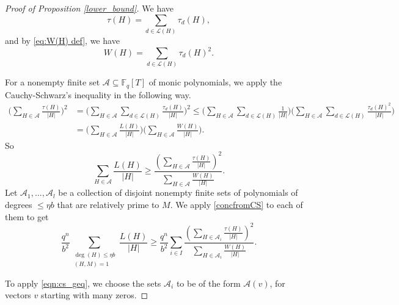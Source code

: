 \documentclass[12pt]{amsart}
\numberwithin{equation}{section}
\theoremstyle{definition}
\theoremstyle{remark}
\newcommand{\FF}{\mathbb{F}}
\begin{document}
\begin{proof}[Proof of Proposition \ref{lower_bound}]
    We have
    \[
        \tau (H) = \sum_{d \in \mathcal{L}(H)} \tau_d(H),
    \]
    and by 
    \eqref{eq:W(H) def}, we have
    \[
        W(H) = \sum_{d \in \mathcal{L}(H)} \tau_d(H)^2.
    \]
    
    For a nonempty finite set $\mathcal{A}\subseteq \FF_q[T]$ of monic polynomials, we apply the Cauchy-Schwarz's inequality in the following way.
    \begin{align*}
        \Big( \sum_{H \in \mathcal{A}} \frac{\tau(H)}{|H|} \Big) ^2 &= 
        \Big( \sum_{H \in \mathcal{A}} \sum_{d \in \mathcal{L}(H)} \frac{\tau_d(H)}{|H|} \Big) ^2  
        \leq
        \Big( \sum_{H \in \mathcal{A}} \sum_{d \in \mathcal{L}(H)} \frac{1}{|H|} \Big) \Big( \sum_{H \in \mathcal{A}} \sum_{d \in \mathcal{L}(H)} \frac{\tau_d(H)^2}{|H|} \Big) \\
        &= \Big( \sum_{H \in \mathcal{A}} \frac{L(H)}{|H|} \Big) 
        \Big( \sum_{H \in \mathcal{A}} \frac{W(H)}{|H|} \Big).
    \end{align*}
    So 
    \begin{equation}\label{concfromCS}
         \sum_{H \in \mathcal{A}} \frac{L(H)}{|H|}  \geq  \frac{ (\sum_{H \in \mathcal{A}} \frac{\tau(H)}{|H|})^2 }{ \sum_{H \in \mathcal{A}} \frac{W(H)}{|H|} }.
    \end{equation}
    Let $\mathcal{A}_1,...,\mathcal{A}_l$ be a collection of disjoint nonempty finite sets of polynomials of degrees $\leq \eta b$ that are relatively prime to $M$. We apply \eqref{concfromCS} to each of them to get 
    \begin{equation}\label{eqn:cs_geq}
        \frac{q^n}{b^2} \sum_{\substack{\deg(H) \leq \eta b \\ (H,M)=1}} \frac{L(H)}{|H|} \geq \frac{q^n}{b^2} \sum_{i \in I} \frac{( \sum_{H \in \mathcal{A}_i} \frac{\tau(H)}{|H|} ) ^2}{ \sum_{H \in \mathcal{A}_i} \frac{W(H)}{|H|} }.
    \end{equation}

    To apply \eqref{eqn:cs_geq}, we choose the sets $\mathcal{A}_i$ to be of the form $\mathcal{A}(v)$, for vectors $v$ starting with many zeros. 
    

\end{proof}
\end{document}
